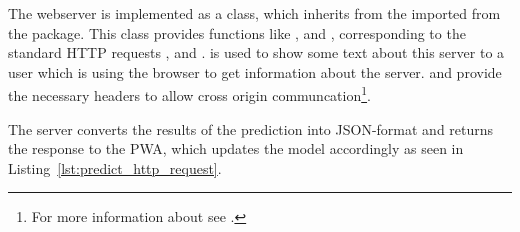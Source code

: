 The webserver is implemented as a  class, which inherits from the  imported from the  package.
This class provides functions like ,  and , corresponding to the standard HTTP requests ,  and .
 is used to show some text about this server to a user which is using the browser to get information about the server.
 and  provide the necessary headers to allow cross origin communcation\footnote{For more information about  see .}.

The server converts the results of the prediction into JSON-format and returns the response to the PWA, which updates the model accordingly as seen in Listing~\ref{lst:predict_http_request}.

